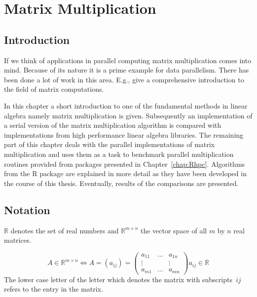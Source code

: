 

\newcommand{\NROW}{\textbf{nrow}}
\newcommand{\NCOL}{\textbf{ncol}}
\newcommand{\OMPFOR}{\textbf{!\$omp parallel for }}
\newcommand{\OMPPRIV}{\textbf{private}}
\newcommand{\OMPSHARE}{\textbf{shared}}
\newcommand{\SERIALMM}{\textbf{serial.mult}}
\newcommand{\MAX}{\textbf{max}}
\chapter{Matrix Multiplication}
\label{chap:matrix}
\section{Introduction}

If we think of applications in parallel computing matrix
multiplication comes into mind. Because of its nature it is a prime
example for data parallelism. There has been done a lot of work in
this area. E.g., \cite{golub96mc} give a comprehensive introduction to the
field of matrix computations. 


In this chapter a short introduction to one of the fundamental methods
in linear algebra namely matrix multiplication is
given. Subsequently an implementation of a serial version of the matrix
multiplication algorithm is compared with implementations from high
performance linear algebra libraries. The remaining part of this
chapter deals with the parallel implementations of matrix
multiplication and uses them as a task to benchmark parallel
multiplication routines provided from packages presented in
Chapter~\ref{chap:Rhpc}. Algorithms from the R package  are
explained in more detail as they have been developed in the course of
this thesis. Eventually, results of the comparisons are presented.

\section{Notation}

$ \mathbb{R} $ denotes the set of real numbers and $ \mathbb{R}^{m
  \times n} $ the vector space of all $m$ by $n$ real matrices.

$$ A \in \mathbb{R}^{m \times n} \Longleftrightarrow A = (a_{ij}) = 
\left( \begin{array}{ccc}
a_{11} & \ldots & a_{1n} \\
\vdots &        & \vdots \\
a_{m1} & \ldots & a_{mn}
\end{array} \right)
a_{ij} \in \mathbb{R}
 $$
The lower case letter of the letter which denotes the matrix with
subscripts~$ij$ refers to the entry in the matrix. 

